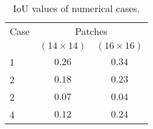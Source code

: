 \begin{table}[ht!]
	\centering
	\caption{IoU values of numerical cases.}
	\label{tab:table_all_numerical_cases_bounding_boxes}
	{
		\begin{tabular}{lcc}
			\toprule[1.5pt]
			Case & \multicolumn{2}{c}{Patches} \\ 
			\cmidrule(lr){2-3} & \multicolumn{1}{c}{\((14\times14)\)} & \multicolumn{1}{c}{\((16\times16)\)} \\			
			\midrule 
			1 & \(0.26\) & \(0.34\) \\
			2 & \(0.18\) & \(0.23\) \\
			2 & \(0.07\) & \(0.04\) \\
			4 & \(0.12\) & \(0.24\) \\
			\bottomrule[1.5pt]
		\end{tabular}
	}
\end{table}
